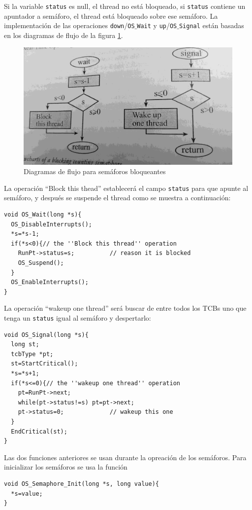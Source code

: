 \documentclass{article}
\begin{document}
Si la variable {\tt status} es null, el thread no est\'a bloqueado, si {\tt status} 
contiene un apuntador a sem\'aforo, el thread est\'a bloqueado sobre ese sem\'aforo. 
La implementaci\'on de las operaciones {\tt down}/{\tt OS}$\_${\tt Wait} y 
{\tt up}/{\tt OS}$\_${\tt Signal} est\'an basadas en los diagramas de flujo de la 
figura \ref{ValvanoVol3Pag176}.
\begin{figure}[h]
\begin{center}
\includegraphics[scale=0.075]{img/OS_Wait_y_OS_Signal.jpg}
\caption{Diagramas de flujo para sem\'aforos bloqueantes}
\label{ValvanoVol3Pag176}
\end{center}
\end{figure}
La operaci\'on ``Block this thead'' establecer\'a el campo {\tt status} para que 
apunte al sem\'aforo, y despu\'es se suspende el thread como se muestra a continuaci\'on:
\begin{verbatim}
void OS_Wait(long *s){
  OS_DisableInterrupts();
  *s=*s-1;
  if(*s<0){// the ''Block this thread'' operation
    RunPt->status=s;          // reason it is blocked
    OS_Suspend();
  }
  OS_EnableInterrupts();
}
\end{verbatim}
La operaci\'on ``wakeup one thread'' ser\'a buscar de entre todos los TCBs uno 
que tenga un {\tt status} igual al sem\'aforo y despertarlo:
\begin{verbatim}
void OS_Signal(long *s){
  long st;
  tcbType *pt;
  st=StartCritical();
  *s=*s+1;
  if(*s<=0){// the ''wakeup one thread'' operation
    pt=RunPt->next;
    while(pt->status!=s) pt=pt->next;
    pt->status=0;             // wakeup this one
  }
  EndCritical(st);
}
\end{verbatim}
Las dos funciones anteriores se usan durante la opreaci\'on de los 
sem\'aforos. Para inicializar los sem\'aforos se usa la funci\'on
\begin{verbatim}
void OS_Semaphore_Init(long *s, long value){
  *s=value;
}
\end{verbatim}
\end{document}

